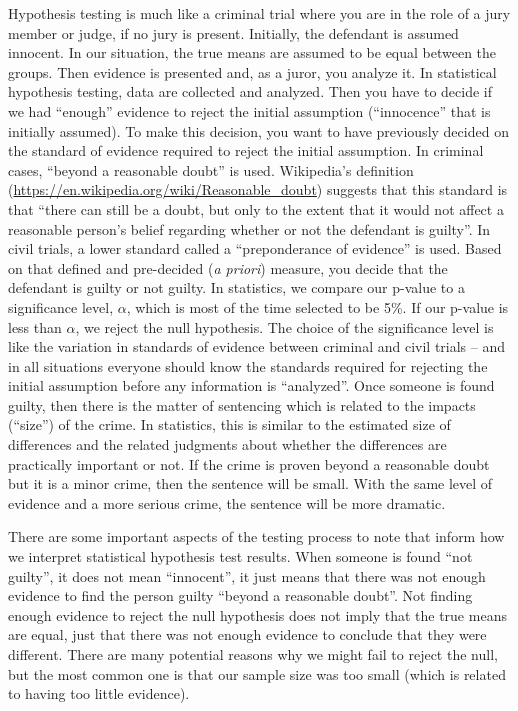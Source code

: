 \documentclass[]{book}
\begin{document}
Hypothesis testing is much like a criminal trial where you are in the
role of a jury member or judge, if no jury is present. Initially, the
defendant is assumed innocent. In our situation, the true means are
assumed to be equal between the groups. Then evidence is presented and,
as a juror, you analyze it. In statistical hypothesis testing, data are
collected and analyzed. Then you have to decide if we had ``enough''
evidence to reject the initial assumption (``innocence'' that is
initially assumed). To make this decision, you want to have previously
decided on the standard of evidence required to reject the initial
assumption. In criminal cases, ``beyond a reasonable doubt'' is used.
Wikipedia's definition
(\url{https://en.wikipedia.org/wiki/Reasonable_doubt}) suggests that
this standard is that ``there can still be a doubt, but only to the
extent that it would not affect a reasonable person's belief regarding
whether or not the defendant is guilty''. In civil trials, a lower
standard called a ``preponderance of evidence'' is used. Based on that
defined and pre-decided (\emph{a priori}) measure, you decide that the
defendant is guilty or not guilty. In statistics, we compare our p-value
to a significance level, \(\alpha\), which is most of the time selected
to be 5\%. If our p-value is less than \(\alpha\), we reject the null
hypothesis. The choice of the significance level is like the variation
in standards of evidence between criminal and civil trials -- and in all
situations everyone should know the standards required for rejecting the
initial assumption before any information is ``analyzed''. Once someone
is found guilty, then there is the matter of sentencing which is related
to the impacts (``size'') of the crime. In statistics, this is similar
to the estimated size of differences and the related judgments about
whether the differences are practically important or not. If the crime
is proven beyond a reasonable doubt but it is a minor crime, then the
sentence will be small. With the same level of evidence and a more
serious crime, the sentence will be more dramatic.

There are some important aspects of the testing process to note that
inform how we interpret statistical hypothesis test results. When
someone is found ``not guilty'', it does not mean ``innocent'', it just
means that there was not enough evidence to find the person guilty
``beyond a reasonable doubt''. Not finding enough evidence to reject the
null hypothesis does not imply that the true means are equal, just that
there was not enough evidence to conclude that they were different.
There are many potential reasons why we might fail to reject the null,
but the most common one is that our sample size was too small (which is
related to having too little evidence).
\end{document}
